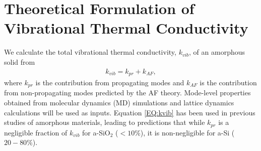 \documentclass[aps,prb,onecolumn,preprint,superscriptaddress,footinbib,amsmath,amssymb,floatfix]{revtex4}
\begin{document}
\section{\label{S:Theory:Thermal}Theoretical Formulation of 
Vibrational Thermal Conductivity}

We calculate the total vibrational thermal conductivity, $k_{vib}$, 
of an amorphous solid from 
\begin{equation}\label{EQ:kvib}
\begin{split}
k_{vib} = k_{pr} + k_{AF},
\end{split}
\end{equation}
where $k_{pr}$ is the contribution from propagating modes
\cite{ziman_electrons_2001} 
and $k_{AF}$ is the contribution from non-propagating modes predicted 
by the AF theory.\cite{feldman_thermal_1993} Mode-level 
properties obtained from molecular dynamics (MD) simulations and 
lattice dynamics calculations will be used as inputs. 
Equation \eqref{EQ:kvib} has been used in 
previous studies of amorphous materials, 
leading to predictions that while $k_{pr}$ is a negligible 
fraction of $k_{vib}$ for a-SiO$_2$ ($< 10\%$),
\cite{graebner_phonon_1986,freeman_thermal_1986,
love_estimate_1990,baldi_thermal_2008} 
it is non-negligible 
for a-Si ($20-80\%$).
\cite{feldman_thermal_1993,cahill_thermal_1994,
feldman_numerical_1999,liu_high_2009,yang_anomalously_2010,
he_heat_2011}
\end{document}
